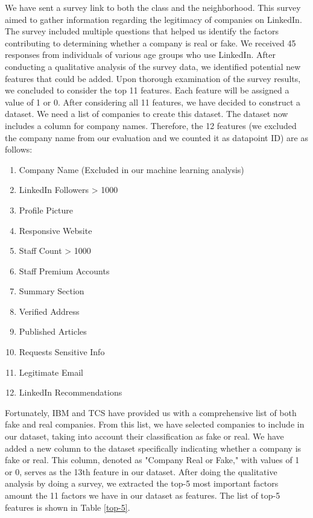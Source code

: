 \documentclass{article}
\begin{document}
We have sent a survey link to both the class and the neighborhood. This survey aimed to gather information regarding the legitimacy of companies on LinkedIn. The survey included multiple questions that helped us identify the factors contributing to determining whether a company is real or fake. We received 45 responses from individuals of various age groups who use LinkedIn. After conducting a qualitative analysis of the survey data, we identified potential new features that could be added. Upon thorough examination of the survey results, we concluded to consider the top 11 features. Each feature will be assigned a value of 1 or 0. After considering all 11 features, we have decided to construct a dataset. We need a list of companies to create this dataset. The dataset now includes a column for company names. Therefore, the 12 features (we excluded the company name from our evaluation and we counted it as datapoint ID) are as follows:  

\begin{enumerate}
\item Company Name (Excluded in our machine learning analysis)
\item LinkedIn Followers > 1000
\item Profile Picture
\item Responsive Website
\item	Staff Count > 1000
\item	Staff Premium Accounts
\item	Summary Section
\item	Verified Address
\item	Published Articles
\item	Requests Sensitive Info
\item	Legitimate Email
\item	LinkedIn Recommendations
\end{enumerate}


Fortunately, IBM and TCS have provided us with a comprehensive list of both fake and real companies. From this list, we have selected companies to include in our dataset, taking into account their classification as fake or real. We have added a new column to the dataset specifically indicating whether a company is fake or real. This column, denoted as "Company Real or Fake," with values of 1 or 0, serves as the 13th feature in our dataset. After doing the qualitative analysis by doing a survey, we extracted the top-5 most important factors amount the 11 factors we have in our dataset as features. The list of top-5 features is shown in Table \ref{top-5}.
\end{document}
